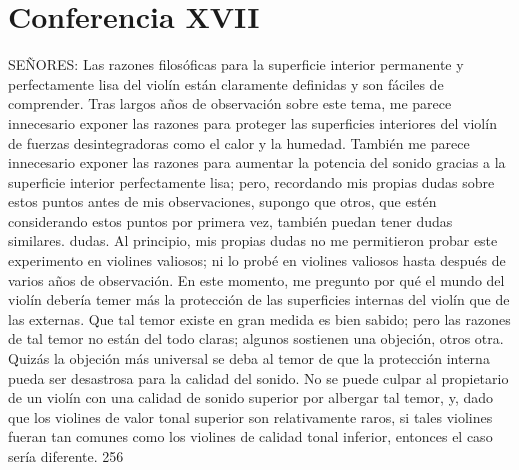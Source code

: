 \chapter*{Conferencia XVII}
SEÑORES: Las razones filosóficas para la superficie interior permanente y perfectamente lisa del violín están claramente definidas y son fáciles de comprender. Tras largos años de observación sobre este tema, me parece innecesario exponer las razones para proteger las superficies interiores del violín de fuerzas desintegradoras como el calor y la humedad. También me parece innecesario exponer las razones para aumentar la potencia del sonido gracias a la superficie interior perfectamente lisa; pero, recordando mis propias dudas sobre estos puntos antes de mis observaciones, supongo que otros, que estén considerando estos puntos por primera vez, también puedan tener dudas similares.
dudas.
Al principio, mis propias dudas no me permitieron probar este experimento en violines valiosos; ni lo probé en violines valiosos hasta después de varios años de observación. En este momento, me pregunto por qué el mundo del violín debería temer más la protección de las superficies internas del violín que de las externas. Que tal temor existe en gran medida es bien sabido; pero las razones de tal temor no están del todo claras; algunos sostienen una objeción, otros otra. Quizás la objeción más universal se deba al temor de que la protección interna pueda ser desastrosa para la calidad del sonido. No se puede culpar al propietario de un violín con una calidad de sonido superior por albergar tal temor, y, dado que los violines de valor tonal superior son relativamente raros, si tales violines fueran tan comunes como los violines de calidad tonal inferior, entonces el caso sería diferente.
256

